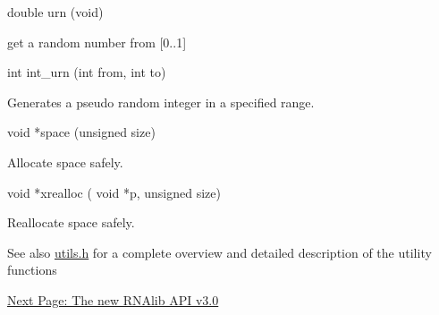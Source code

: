 \begin{DoxyVerb}double urn (void)
\end{DoxyVerb}
 get a random number from \mbox{[}0..1\mbox{]}

\begin{DoxyVerb}int    int_urn (int from, int to)
\end{DoxyVerb}
 Generates a pseudo random integer in a specified range.

\begin{DoxyVerb}void  *space (unsigned size)
\end{DoxyVerb}
 Allocate space safely.

\begin{DoxyVerb}void  *xrealloc ( void *p,
                  unsigned size)
\end{DoxyVerb}
 Reallocate space safely.

\begin{DoxySeeAlso}{See also}
\hyperlink{utils_8h}{utils.\+h} for a complete overview and detailed description of the utility functions
\end{DoxySeeAlso}


\hyperlink{mp_example}{Next Page\+: The new R\+N\+Alib A\+PI v3.0} 